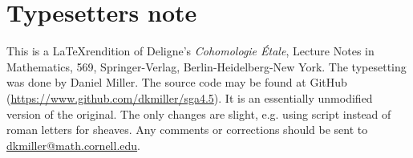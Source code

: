 \section*{Typesetters note}

This is a \LaTeX rendition of Deligne's \emph{Cohomologie \'Etale}, Lecture 
Notes in Mathematics, 569, Springer-Verlag, Berlin-Heidelberg-New York. The 
typesetting was done by Daniel Miller. The source code may be found at 
GitHub (\url{https://www.github.com/dkmiller/sga4.5}). It is an essentially 
unmodified version of the original. The only changes are slight, e.g. using 
script instead of roman letters for sheaves. Any comments or corrections should 
be sent to \url{dkmiller@math.cornell.edu}.